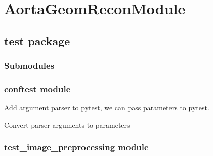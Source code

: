 \documentclass[letterpaper,10pt,english]{sphinxmanual}
\begin{document}
\section{AortaGeomReconModule}
\label{\detokenize{modules:aortageomreconmodule}}\label{\detokenize{modules::doc}}

\subsection{test package}
\label{\detokenize{test:test-package}}\label{\detokenize{test::doc}}

\subsubsection{Submodules}
\label{\detokenize{test:submodules}}

\subsubsection{conftest module}
\label{\detokenize{test:module-conftest}}\label{\detokenize{test:conftest-module}}

\begin{fulllineitems}
\label{\detokenize{test:conftest.pytest_addoption}}
\sphinxAtStartPar
Add argument parser to pytest, we can pass parameters to pytest.

\end{fulllineitems}


\begin{fulllineitems}
\label{\detokenize{test:conftest.pytest_generate_tests}}
\sphinxAtStartPar
Convert parser arguments to parameters

\end{fulllineitems}



\subsubsection{test\_image\_preprocessing module}
\label{\detokenize{test:module-test_image_preprocessing}}\label{\detokenize{test:test-image-preprocessing-module}}
\end{document}
